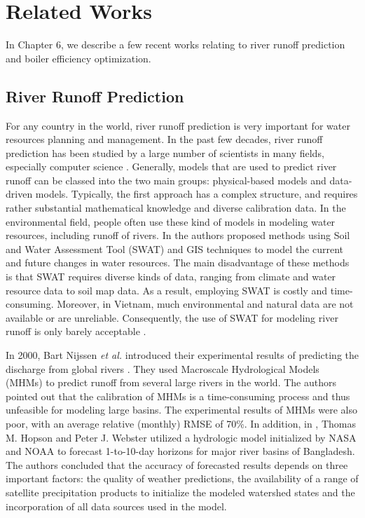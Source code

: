 \chapter{Related Works}
\label{chap:relatedwork}

In Chapter 6, we describe a few recent works relating to river runoff prediction and boiler efficiency optimization.

\minitoc

\section{River Runoff Prediction}

For any country in the world, river runoff prediction is very important for water resources planning and management. In the past few decades, river runoff prediction has been studied by a large number of scientists in many fields, especially computer science \cite{ANN:ref_87, ANN:ref_88}. Generally, models that are used to predict river runoff can be classed into the two main groups: physical-based models and data-driven models. Typically, the first approach has a complex structure, and requires rather substantial mathematical knowledge and diverse calibration data. In the environmental field, people often use these kind of models in modeling water resources, including runoff of rivers. In \cite{swatref01, swatref05, swatref02, swatref03, swatref04, swatref06} the authors proposed methods using Soil and Water Assessment Tool (SWAT) and GIS techniques to model the current and future changes in water resources. The main disadvantage of these methods is that SWAT requires diverse kinds of data, ranging from climate and water resource data to soil map data. As a result, employing SWAT is costly and time-consuming. Moreover, in Vietnam, much environmental and natural data are not available or are unreliable. Consequently, the use of SWAT for modeling river runoff is only barely acceptable \cite{swatref01, swatref05}. 

In 2000, Bart Nijssen \textit{et al.} introduced their experimental results of predicting the discharge from global rivers \cite{ANN:ref_85}. They used Macroscale Hydrological Models (MHMs) to predict runoff from several large rivers in the world. The authors pointed out that the calibration of MHMs is a time-consuming process and thus unfeasible for modeling large basins. The experimental results of MHMs were also poor, with an average relative (monthly) RMSE of 70\%. In addition, in \cite{ANN:ref_82}, Thomas M. Hopson and Peter J. Webster utilized a hydrologic model initialized by NASA and NOAA to forecast 1-to-10-day horizons for major river basins of Bangladesh. The authors concluded that the accuracy of forecasted results depends on three important factors: the quality of weather predictions, the availability of a range of satellite precipitation products to initialize the modeled watershed states and the incorporation of all data sources used in the model. 

